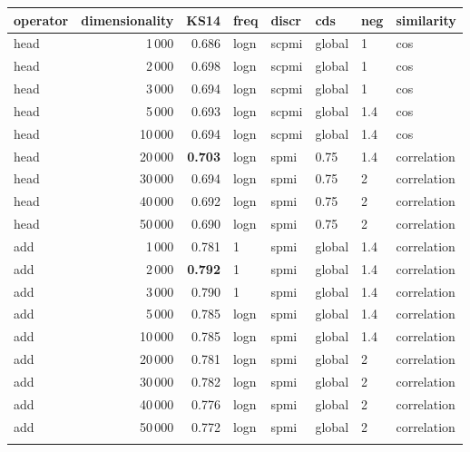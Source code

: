 \begin{tabular}{lrrlllll}
\toprule
operator &  dimensionality &   KS14 &  freq &  discr &     cds &  neg &     similarity \\
\midrule
    head &            1\,000 &  0.686 &  logn &  scpmi &  global &    1 &            cos \\
    head &            2\,000 &  0.698 &  logn &  scpmi &  global &    1 &            cos \\
    head &            3\,000 &  0.694 &  logn &  scpmi &  global &    1 &            cos \\
    head &            5\,000 &  0.693 &  logn &  scpmi &  global &  1.4 &            cos \\
    head &           10\,000 &  0.694 &  logn &  scpmi &  global &  1.4 &            cos \\
    head &           20\,000 &  \textbf{0.703} &  logn &   spmi &    0.75 &  1.4 &    correlation \\
    head &           30\,000 &  0.694 &  logn &   spmi &    0.75 &    2 &    correlation \\
    head &           40\,000 &  0.692 &  logn &   spmi &    0.75 &    2 &    correlation \\
    head &           50\,000 &  0.690 &  logn &   spmi &    0.75 &    2 &    correlation \\ \addlinespace
     add &            1\,000 &  0.781 &     1 &   spmi &  global &  1.4 &    correlation \\
     add &            2\,000 & \textbf{ 0.792} &     1 &   spmi &  global &  1.4 &    correlation \\
     add &            3\,000 &  0.790 &     1 &   spmi &  global &  1.4 &    correlation \\
     add &            5\,000 &  0.785 &  logn &   spmi &  global &  1.4 &    correlation \\
     add &           10\,000 &  0.785 &  logn &   spmi &  global &  1.4 &    correlation \\
     add &           20\,000 &  0.781 &  logn &   spmi &  global &    2 &    correlation \\
     add &           30\,000 &  0.782 &  logn &   spmi &  global &    2 &    correlation \\
     add &           40\,000 &  0.776 &  logn &   spmi &  global &    2 &    correlation \\
     add &           50\,000 &  0.772 &  logn &   spmi &  global &    2 &    correlation \\ \addlinespace

\end{tabular}
